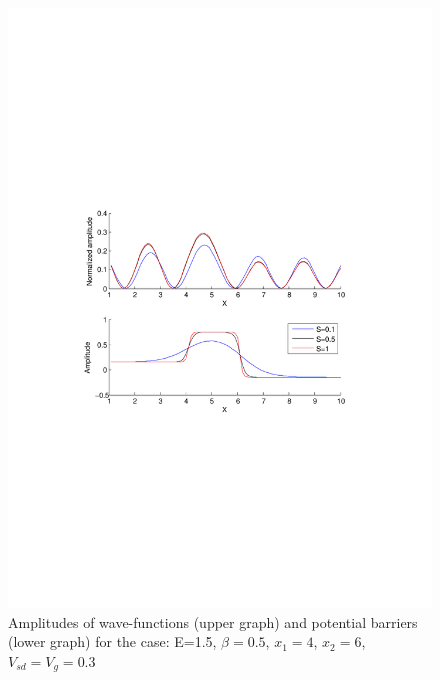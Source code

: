 \documentclass[•]{beamer}
\theoremstyle{remark}
\begin{document}
\begin{frame}
\begin{figure}[h!]
\centering
\includegraphics[scale=0.4]{test3}
\caption{Amplitudes of wave-functions (upper graph) and potential barriers (lower graph) for the case: E=1.5, $\beta=0.5$, $x_1=4$, $x_2=6$, $V_{sd}=V_g=0.3$}
\label{fig:test3}
\end{figure}
\end{frame}
\end{document}
